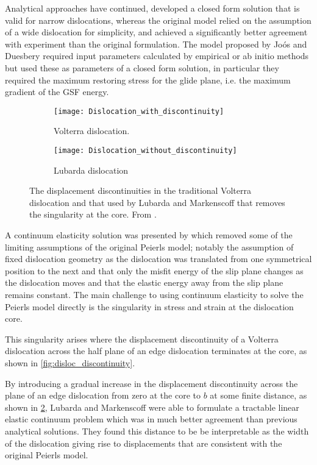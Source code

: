 Analytical approaches have continued, \citet{Joos1997} developed a closed form solution that is valid for narrow dislocations, whereas the original model relied on the assumption of a wide dislocation for simplicity, and achieved a significantly better agreement with experiment than the original formulation. The model proposed by Jo\'{o}s and Duesbery required input parameters calculated by empirical or ab initio methods but used these as parameters of a closed form solution, in particular they required the maximum restoring stress for the glide plane, i.e. the maximum gradient of the GSF energy.

\begin{figure}
\centering
\begin{subfigure}{0.4\textwidth}
\centering
\texttt{[image: Dislocation\_with\_discontinuity]}
\caption{Volterra dislocation.\label{fig:disloc_discontinuity}}
\end{subfigure}%
\begin{subfigure}{0.4\textwidth}
\centering
\texttt{[image: Dislocation\_without\_discontinuity]}
\caption{Lubarda dislocation\label{fig:disloc_no_discontinuity}}
\end{subfigure}
\captionsetup{width=0.8\textwidth}
\caption[Volterra and Lubarda dislocations.]{The displacement discontinuities in the traditional Volterra dislocation and that used by Lubarda and Markenscoff that removes the singularity at the core. From \cite{Lubarda2007}.\label{fig:discontinuity}}
\end{figure}

A continuum elasticity solution was presented by \citet{Lubarda2007} which removed some of the limiting assumptions of the original Peierls model; notably the assumption of fixed dislocation geometry as the dislocation was translated from one symmetrical position to the next and that only the misfit energy of the slip plane changes as the dislocation moves and that the elastic energy away from the slip plane remains constant. The main challenge to using continuum elasticity to solve the Peierls model directly is the singularity in stress and strain at the dislocation core. 


This singularity arises where the displacement discontinuity of a Volterra dislocation across the half plane of an edge dislocation terminates at the core, as shown in \autoref{fig:disloc_discontinuity}. 


By introducing a gradual increase in the displacement discontinuity across the plane of an edge dislocation from zero at the core to $b$ at some finite distance, as shown in \ref{fig:disloc_no_discontinuity}, Lubarda and Markenscoff were able to formulate a tractable linear elastic continuum problem which was in much better agreement than previous analytical solutions. They found this distance to be be interpretable as the width of the dislocation giving rise to displacements that are consistent with the original Peierls model. 



